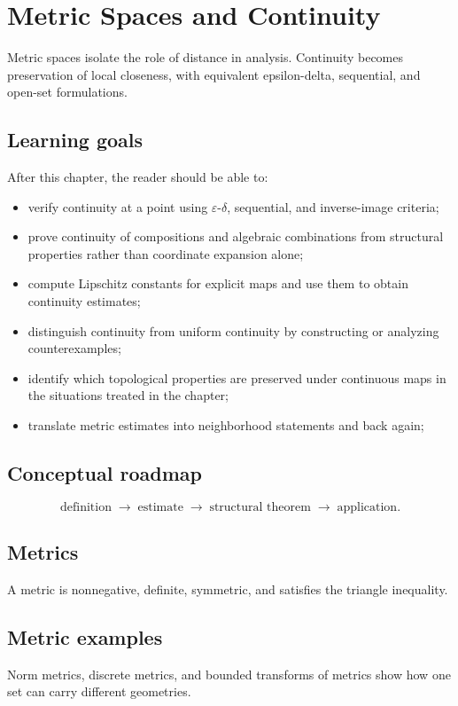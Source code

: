 \chapter{Metric Spaces and Continuity}
\label{ch:ii05}

Metric spaces isolate the role of distance in analysis. Continuity becomes preservation of local closeness, with equivalent epsilon-delta, sequential, and open-set formulations.

\section*{Learning goals}
After this chapter, the reader should be able to:
\begin{itemize}
\item verify continuity at a point using \(\varepsilon\)-\(\delta\), sequential, and inverse-image criteria;
\item prove continuity of compositions and algebraic combinations from structural properties rather than coordinate expansion alone;
\item compute Lipschitz constants for explicit maps and use them to obtain continuity estimates;
\item distinguish continuity from uniform continuity by constructing or analyzing counterexamples;
\item identify which topological properties are preserved under continuous maps in the situations treated in the chapter;
\item translate metric estimates into neighborhood statements and back again;
\end{itemize}
\section*{Conceptual roadmap}
\[
\boxed{\text{definition}\;\longrightarrow\;\text{estimate}\;\longrightarrow\;\text{structural theorem}\;\longrightarrow\;\text{application}.}
\]

\section{Metrics}
A metric is nonnegative, definite, symmetric, and satisfies the triangle inequality.

\section{Metric examples}
Norm metrics, discrete metrics, and bounded transforms of metrics show how one set can carry different geometries.

